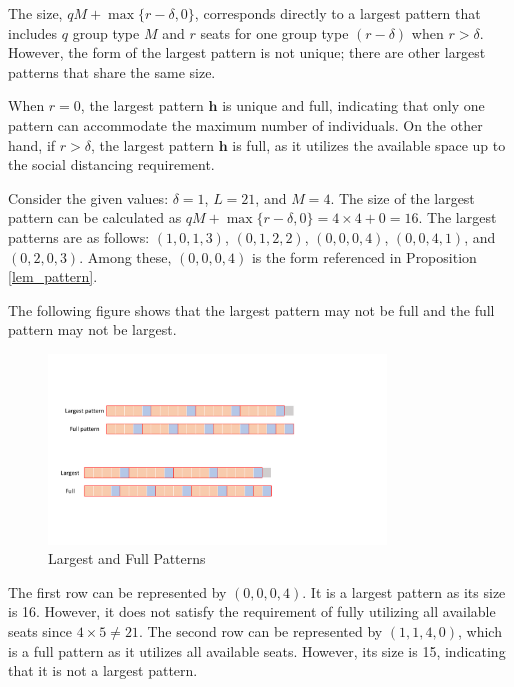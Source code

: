 % 

The size, $qM + \max\{r-\delta, 0\}$, corresponds directly to a largest pattern that includes $q$ group type $M$ and $r$ seats for one group type $(r-\delta)$ when $r>\delta$. However, the form of the largest pattern is not unique; there are other largest patterns that share the same size.


When $r = 0$, the largest pattern $\bm{h}$ is unique and full, indicating that only one pattern can accommodate the maximum number of individuals. On the other hand, if $r > \delta$, the largest pattern $\bm{h}$ is full, as it utilizes the available space up to the social distancing requirement.

\begin{example}
Consider the given values: $\delta = 1$, $L = 21$, and $M = 4$. The size of the largest pattern can be calculated as $qM + \max\{r-\delta, 0\} = 4 \times 4 + 0 = 16$. The largest patterns are as follows: $(1, 0, 1, 3)$, $(0, 1, 2, 2)$, $(0, 0, 0, 4)$, $(0, 0, 4, 1)$, and $(0, 2, 0, 3)$. Among these, $(0, 0, 0, 4)$ is the form referenced in Proposition \ref{lem_pattern}.

The following figure shows that the largest pattern may not be full and the full pattern may not be largest.
\begin{figure}[ht]
    \centering
        \includegraphics[width=0.8\textwidth]{./Figures/full.pdf}
    \caption{Largest and Full Patterns}
\end{figure}

The first row can be represented by $(0, 0, 0, 4)$. It is a largest pattern as its size is 16. However, it does not satisfy the requirement of fully utilizing all available seats since $4 \times 5 \neq 21$. The second row can be represented by $(1, 1, 4, 0)$, which is a full pattern as it utilizes all available seats. However, its size is 15, indicating that it is not a largest pattern.
\end{example}

